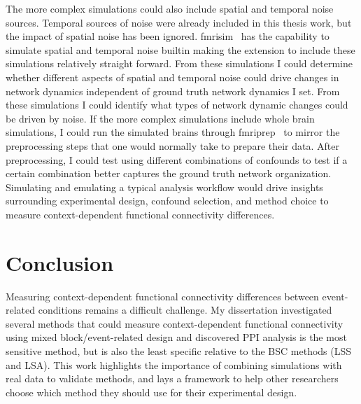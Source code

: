 \documentclass[phd,figures,tables,ackpage,abstractpage,publicabstractpage]{uithesis}
\begin{document}
The more complex simulations could also include spatial and temporal
noise sources.
Temporal sources of noise were already included in this thesis work,
but the impact of spatial noise has been ignored.
fmrisim~\cite{Ellis2020} has the capability to simulate spatial and
temporal noise builtin making the extension to include these simulations
relatively straight forward.
From these simulations I could determine whether different aspects of
spatial and temporal noise could drive changes in network
dynamics independent of ground truth network dynamics I set.
From these simulations I could identify what types of network dynamic
changes could be driven by noise.
If the more complex simulations include whole brain simulations,
I could run the simulated brains through fmriprep~\cite{fmriprep1}
to mirror the preprocessing steps that one would normally take
to prepare their data.
After preprocessing, I could test using different combinations of
confounds to test if a certain combination better captures the
ground truth network organization.
Simulating and emulating a typical analysis workflow would
drive insights surrounding experimental design, confound selection,
and method choice to measure context-dependent functional connectivity
differences.

\section{Conclusion}

Measuring context-dependent functional connectivity differences between
event-related conditions remains a difficult challenge.
My dissertation investigated several methods that could
measure context-dependent functional connectivity
using mixed block/event-related design and discovered PPI
analysis is the most sensitive method, but is also the least specific
relative to the BSC methods (LSS and LSA).
This work highlights the importance of combining
simulations with real data to validate methods, and lays a framework
to help other researchers choose which method they should use
for their experimental design.
\end{document}
